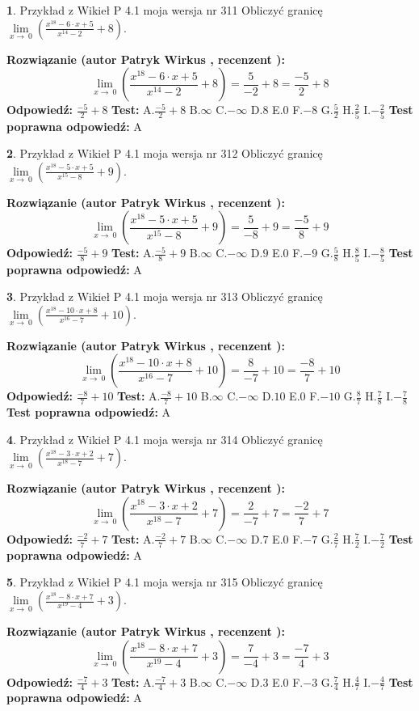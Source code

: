 \documentclass[12pt, a4paper]{article}
\theoremstyle{definition} %
\newtheorem{zad}{}
\newcommand{\zadStart}[1]{\begin{zad}#1\newline}
\newcommand{\zadStop}{\end{zad}}
\newcommand{\rozwStart}[2]{\noindent \textbf{Rozwiązanie (autor #1 , recenzent #2): }\newline}
\newcommand{\rozwStop}{\newline}
\newcommand{\odpStart}{\noindent \textbf{Odpowiedź:}\newline}
\newcommand{\odpStop}{\newline}
\newcommand{\testStart}{\noindent \textbf{Test:}\newline}
\newcommand{\testStop}{\newline}
\newcommand{\kluczStart}{\noindent \textbf{Test poprawna odpowiedź:}\newline}
\newcommand{\kluczStop}{\newline}
\begin{document}
\zadStart{Przykład z Wikieł P 4.1 moja wersja nr 311}
Obliczyć granicę $\lim\limits_{x\to\ 0}(\frac{x^{18}-6 \cdot x +5}{x^{14}-2}+8)$.
\zadStop
\rozwStart{Patryk Wirkus}{}
$$\lim\limits_{x\to\ 0}(\frac{x^{18}-6 \cdot x +5}{x^{14}-2}+8)=\frac{5}{-2}+8=\frac{-5}{2}+8$$
\rozwStop
\odpStart
$\frac{-5}{2}+8$
\odpStop
\testStart
A.$\frac{-5}{2}+8$
B.$\infty$
C.$-\infty$
D.$8$
E.$0$
F.$-8$
G.$\frac{5}{2}$
H.$\frac{2}{5}$
I.$-\frac{2}{5}$
\testStop
\kluczStart
A
\kluczStop



\zadStart{Przykład z Wikieł P 4.1 moja wersja nr 312}
Obliczyć granicę $\lim\limits_{x\to\ 0}(\frac{x^{18}-5 \cdot x +5}{x^{15}-8}+9)$.
\zadStop
\rozwStart{Patryk Wirkus}{}
$$\lim\limits_{x\to\ 0}(\frac{x^{18}-5 \cdot x +5}{x^{15}-8}+9)=\frac{5}{-8}+9=\frac{-5}{8}+9$$
\rozwStop
\odpStart
$\frac{-5}{8}+9$
\odpStop
\testStart
A.$\frac{-5}{8}+9$
B.$\infty$
C.$-\infty$
D.$9$
E.$0$
F.$-9$
G.$\frac{5}{8}$
H.$\frac{8}{5}$
I.$-\frac{8}{5}$
\testStop
\kluczStart
A
\kluczStop



\zadStart{Przykład z Wikieł P 4.1 moja wersja nr 313}
Obliczyć granicę $\lim\limits_{x\to\ 0}(\frac{x^{18}-10 \cdot x +8}{x^{16}-7}+10)$.
\zadStop
\rozwStart{Patryk Wirkus}{}
$$\lim\limits_{x\to\ 0}(\frac{x^{18}-10 \cdot x +8}{x^{16}-7}+10)=\frac{8}{-7}+10=\frac{-8}{7}+10$$
\rozwStop
\odpStart
$\frac{-8}{7}+10$
\odpStop
\testStart
A.$\frac{-8}{7}+10$
B.$\infty$
C.$-\infty$
D.$10$
E.$0$
F.$-10$
G.$\frac{8}{7}$
H.$\frac{7}{8}$
I.$-\frac{7}{8}$
\testStop
\kluczStart
A
\kluczStop



\zadStart{Przykład z Wikieł P 4.1 moja wersja nr 314}
Obliczyć granicę $\lim\limits_{x\to\ 0}(\frac{x^{18}-3 \cdot x +2}{x^{18}-7}+7)$.
\zadStop
\rozwStart{Patryk Wirkus}{}
$$\lim\limits_{x\to\ 0}(\frac{x^{18}-3 \cdot x +2}{x^{18}-7}+7)=\frac{2}{-7}+7=\frac{-2}{7}+7$$
\rozwStop
\odpStart
$\frac{-2}{7}+7$
\odpStop
\testStart
A.$\frac{-2}{7}+7$
B.$\infty$
C.$-\infty$
D.$7$
E.$0$
F.$-7$
G.$\frac{2}{7}$
H.$\frac{7}{2}$
I.$-\frac{7}{2}$
\testStop
\kluczStart
A
\kluczStop



\zadStart{Przykład z Wikieł P 4.1 moja wersja nr 315}
Obliczyć granicę $\lim\limits_{x\to\ 0}(\frac{x^{18}-8 \cdot x +7}{x^{19}-4}+3)$.
\zadStop
\rozwStart{Patryk Wirkus}{}
$$\lim\limits_{x\to\ 0}(\frac{x^{18}-8 \cdot x +7}{x^{19}-4}+3)=\frac{7}{-4}+3=\frac{-7}{4}+3$$
\rozwStop
\odpStart
$\frac{-7}{4}+3$
\odpStop
\testStart
A.$\frac{-7}{4}+3$
B.$\infty$
C.$-\infty$
D.$3$
E.$0$
F.$-3$
G.$\frac{7}{4}$
H.$\frac{4}{7}$
I.$-\frac{4}{7}$
\testStop
\kluczStart
A
\kluczStop
\end{document}
